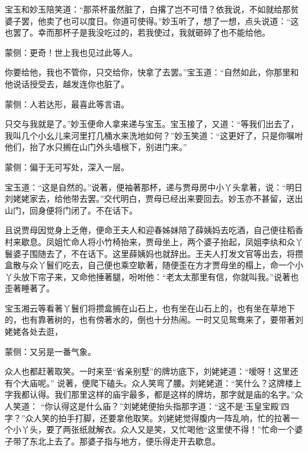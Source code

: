 \begin{parag}
    宝玉和妙玉陪笑道：“那茶杯虽然脏了，白撂了岂不可惜？依我说，不如就给那贫婆子罢，他卖了也可以度日。你道可使得。”妙玉听了，想了一想，点头说道：“这也罢了。幸而那杯子是我没吃过的，若我使过，我就砸碎了也不能给他。\begin{note}蒙侧：更奇！世上我也见过此等人。\end{note}你要给他，我也不管你，只交给你，快拿了去罢。”宝玉道：“自然如此，你那里和他说话授受去，越发连你也脏了。\begin{note}蒙侧：人若达形，最喜此等言语。\end{note}只交与我就是了。”妙玉便命人拿来递与宝玉。宝玉接了，又道：“等我们出去了，我叫几个小幺儿来河里打几桶水来洗地如何？”妙玉笑道：“这更好了，只是你嘱咐他们，抬了水只搁在山门外头墙根下，别进门来。”\begin{note}蒙侧：偏于无可写处，深入一层。\end{note}宝玉道：“这是自然的。”说著，便袖著那杯，递与贾母房中小丫头拿著，说：“明日刘姥姥家去，给他带去罢。”交代明白，贾母已经出来要回去。妙玉亦不甚留，送出山门，回身便将门闭了。不在话下。
\end{parag}


\begin{parag}
    且说贾母因觉身上乏倦，便命王夫人和迎春姊妹陪了薛姨妈去吃酒，自己便往稻香村来歇息。凤姐忙命人将小竹椅抬来，贾母坐上，两个婆子抬起，凤姐李纨和众丫鬟婆子围随去了，不在话下。这里薛姨妈也就辞出。王夫人打发文官等出去，将攒盒散与众丫鬟们吃去，自己便也乘空歇著，随便歪在方才贾母坐的榻上，命一个小丫头放下帘子来，又命他捶著腿，吩咐他：“老太太那里有信，你就叫我。”说著也歪著睡著了。
\end{parag}


\begin{parag}
    宝玉湘云等看著丫鬟们将攒盒搁在山石上，也有坐在山石上的，也有坐在草地下的，也有靠著树的，也有傍著水的，倒也十分热闹。一时又见鸳鸯来了，要带著刘姥姥各处去逛，\begin{note}蒙侧：又另是一番气象。\end{note}众人也都赶著取笑。一时来至“省亲别墅”的牌坊底下，刘姥姥道：“嗳呀！这里还有个大庙呢。” 说著，便爬下磕头。众人笑弯了腰。刘姥姥道：“笑什么？这牌楼上字我都认得。我们那里这样的庙宇最多，都是这样的牌坊，那字就是庙的名字。”众人笑道： “你认得这是什么庙？”刘姥姥便抬头指那字道：“这不是‘玉皇宝殿’四字？”众人笑的拍手打脚，还要拿他取笑。刘姥姥觉得腹内一阵乱响，忙的拉著一个小丫头，要了两张纸就解衣。众人又是笑，又忙喝他“这里使不得！”忙命一个婆子带了东北上去了。那婆子指与地方，便乐得走开去歇息。
\end{parag}


